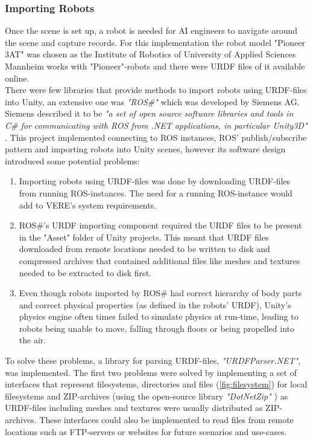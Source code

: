 \subsubsection{Importing Robots}
Once the scene is set up, a robot is needed for \acs{AI} engineers to navigate around the scene and capture records. For this implementation the robot model "Pioneer 3AT" was chosen as the Institute of Robotics of University of Applied Sciences Mannheim works with "Pioneer"-robots and there were \ac{URDF} files of it available \cite{AmrRosConfig} online.\\
There were few libraries that provide methods to import robots using URDF-files into Unity, an extensive one was \textit{"ROS\#"} which was developed by Siemens AG. Siemens described it to be \textit{"a set of open source software libraries and tools in C\# for communicating with ROS from .NET applications, in particular Unity3D"} \cite{RosSharp}. This project implemented connecting to ROS instances, ROS' publish/subscribe pattern and importing robots into Unity scenes, however its software design introduced some potential problems: 
\begin{enumerate}
    \item Importing robots using URDF-files was done by downloading URDF-files from running ROS-instances. The need for a running ROS-instance would add to \ac{VERE}'s system requirements.
    \item ROS\#'s URDF importing component required the URDF files to be present in the "Asset" folder of Unity projects. This meant that URDF files downloaded from remote locations needed to be written to disk and compressed archives that contained additional files like meshes and textures needed to be extracted to disk first.
    \item Even though robots imported by ROS\# had correct hierarchy of body parts and correct physical properties (as defined in the robots' URDF), Unity's physics engine often times failed to simulate physics at run-time, leading to robots being unable to move, falling through floors or being propelled into the air.
\end{enumerate}
To solve these problems, a library for parsing URDF-files, \textit{"URDFParser.NET"}, was implemented. The first two problems were solved by implementing a set of interfaces that represent filesystems, directories and files (\ref{fig:filesystem}) for local filesystems and ZIP-archives (using the open-source library \textit{"DotNetZip"} \cite{DotNetZip}) as URDF-files including meshes and textures were usually distributed as ZIP-archives. These interfaces could also be implemented to read files from remote locations such as FTP-servers or websites for future scenarios and use-cases.
